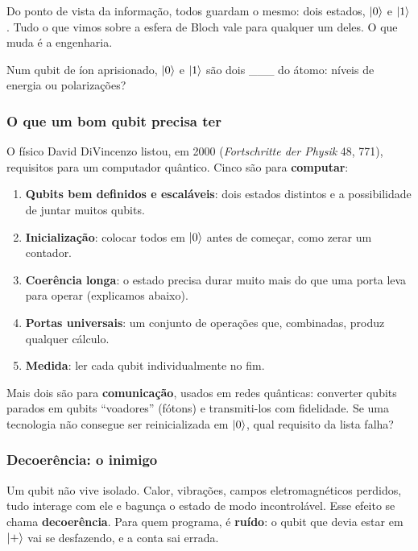 Do ponto de vista da informação, todos guardam o mesmo: dois estados, \(\left|{0}\right>\) e \(\left|{1}\right>\). Tudo o que vimos sobre a esfera de Bloch vale para qualquer um deles. O que muda é a engenharia.

Num qubit de íon aprisionado, \(\left|{0}\right>\) e \(\left|{1}\right>\) são dois \_\_\_ do átomo: níveis de energia ou polarizações?

\subsubsection{O que um bom qubit precisa ter}\label{o-que-um-bom-qubit-precisa-ter}

O físico David DiVincenzo listou, em 2000 (\emph{Fortschritte der Physik} 48, 771), requisitos para um computador quântico. Cinco são para \textbf{computar}:

\begin{enumerate}
\def\labelenumi{\arabic{enumi}.}
\tightlist
\item
  \textbf{Qubits bem definidos e escaláveis}: dois estados distintos e a possibilidade de juntar muitos qubits.
\item
  \textbf{Inicialização}: colocar todos em \(\left|{0}\right>\) antes de começar, como zerar um contador.
\item
  \textbf{Coerência longa}: o estado precisa durar muito mais do que uma porta leva para operar (explicamos abaixo).
\item
  \textbf{Portas universais}: um conjunto de operações que, combinadas, produz qualquer cálculo.
\item
  \textbf{Medida}: ler cada qubit individualmente no fim.
\end{enumerate}

Mais dois são para \textbf{comunicação}, usados em redes quânticas: converter qubits parados em qubits ``voadores'' (fótons) e transmiti-los com fidelidade. Se uma tecnologia não consegue ser reinicializada em \(\left|{0}\right>\), qual requisito da lista falha?

\subsubsection{Decoerência: o inimigo}\label{decoeruxeancia-o-inimigo}

Um qubit não vive isolado. Calor, vibrações, campos eletromagnéticos perdidos, tudo interage com ele e bagunça o estado de modo incontrolável. Esse efeito se chama \textbf{decoerência}. Para quem programa, é \textbf{ruído}: o qubit que devia estar em \(\left|{+}\right>\) vai se desfazendo, e a conta sai errada.


